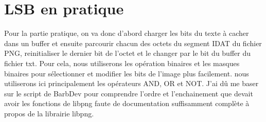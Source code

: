 \newpage
\section{LSB en pratique}
Pour la partie pratique, on va donc d'abord charger les bits du texte à cacher dans un buffer et ensuite parcourir chacun des octets du segment IDAT du fichier PNG, reinitialiser le dernier bit de l'octet et le changer par le bit du buffer du fichier txt.
\newline
Pour cela, nous utiliserons les opération binaires et les masques binaires pour sélectionner et modifier les bits de l'image plus facilement. nous utiliserons ici principalement les opérateurs AND, OR et NOT.
\newline
J'ai dû me baser sur le script de BarbDev pour comprendre l'ordre et l'enchainement que devait avoir les fonctions de libpng \cite{textHidingInText} faute de documentation suffisamment complète à propos de la librairie libpng. 

